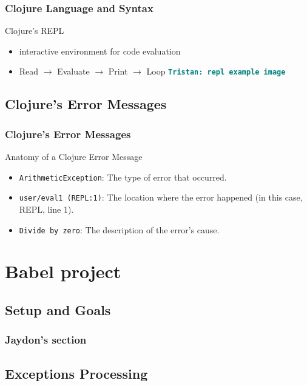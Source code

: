 \documentclass{beamer}
\newcommand{\comment}[1]{{\bf \tt  {#1}}}
\newcommand{\tkcomment}[1]{\textcolor{Teal}{\comment{Tristan: {#1}}}}
\begin{document}
\begin{frame}
  \frametitle{Clojure Language and Syntax}
  Clojure's REPL
  \begin{itemize}
    \item interactive environment for code evaluation
    \item Read \(\rightarrow\) Evaluate \(\rightarrow\) Print \(\rightarrow\) Loop
    \tkcomment{repl example image}
  \end{itemize}  
\end{frame}

\subsection{Clojure's Error Messages}
\begin{frame}
    \frametitle{Clojure's Error Messages}
    Anatomy of a Clojure Error Message
  
    \begin{itemize}
      \item \texttt{ArithmeticException}: The type of error that occurred.
      \item \texttt{user/eval1 (REPL:1)}: The location where the error happened (in this case, REPL, line 1).
      \item \texttt{Divide by zero}: The description of the error's cause.
    \end{itemize}
\end{frame}

\section{Babel project}

\subsection{Setup and Goals}

\begin{frame}
\frametitle{Jaydon's section}

\end{frame}

\subsection{Exceptions Processing}
\end{document}

